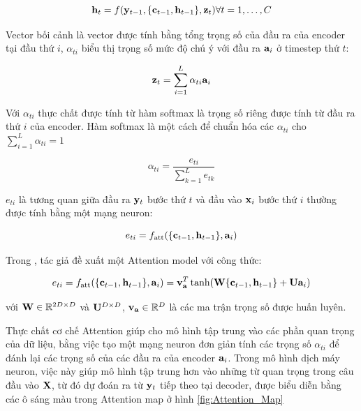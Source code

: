 \documentclass[14pt, a4paper]{article}
\numberwithin{equation}{section}
\numberwithin{algorithm}{section}
\numberwithin{figure}{section}
\numberwithin{dl}{section}
\numberwithin{md}{section}
\numberwithin{bd}{section}
\numberwithin{dn}{section}
\numberwithin{hq}{section}
\begin{document}
    \begin{equation}
        \bold{h}_t = f(\bold{y}_{t-1}, \lbrace \bold{c}_{t-1}, \bold{h}_{t-1} \rbrace, \bold{z}_t) \forall t=1,\dots,C
    \end{equation}

    Vector bối cảnh là vector được tính bằng tổng trọng số của đầu ra của encoder tại đầu thứ $i$, $\alpha_{ti}$ biểu thị trọng số mức độ chú ý với đầu ra $\bold{a}_i$ ở timestep thứ $t$:

    \begin{equation}
        \bold{z}_t = \sum_{i=1}^{L}\alpha_{ti}\bold{a}_i
    \end{equation}

    Với $\alpha_{ti}$ thực chất được tính từ hàm softmax là trọng số riêng được tính từ đầu ra thứ $i$ của encoder. Hàm softmax là một cách để chuẩn hóa các $\alpha_{ti}$ cho $\sum_{i=1}^{L}\alpha_{ti}=1$

    \begin{equation}
        \alpha_{ti} = \dfrac{e_{ti}}{\sum_{k=1}^{L} e_{tk}}
    \end{equation}

    $e_{ti}$ là tương quan giữa đầu ra $\bold{y}_t$ bước thứ $t$ và đầu vào $\bold{x}_i$ bước thứ $i$ thường được tính bằng một mạng neuron:

    \begin{equation}
        e_{ti} = f_{\text{att}}(\lbrace \bold{c}_{t-1}, \bold{h}_{t-1} \rbrace, \bold{a}_i)
    \end{equation}

    Trong \cite{bahdanau2014neural}, tác giả đề xuất một Attention model với công thức:

    \begin{equation}
        e_{ti} = f_{\text{att}}(\lbrace \bold{c}_{t-1}, \bold{h}_{t-1} \rbrace, \bold{a}_i) = \bold{v}_{\bold{a}}^T \tanh (\bold{W} \lbrace \bold{c}_{t-1}, \bold{h}_{t-1} \rbrace + \bold{U}\bold{a}_i)
    \end{equation}

    với $\bold{W} \in \mathbb{R}^{2D \times D}$ và $\bold{U}^{D \times D}$, $\bold{v}_{\bold{a}} \in \mathbb{R}^{D}$ là các ma trận trọng số được huấn luyên.

    Thực chất cơ chế Attention giúp cho mô hình tập trung vào các phần quan trọng của dữ liệu, bằng việc tạo một mạng neuron đơn giản tính các trọng số $\alpha_{ti}$ để đánh lại các trọng số của các đầu ra của encoder $\bold{a}_i$.
    Trong mô hình dịch máy neuron, việc này giúp mô hình tập trung hơn vào những từ quan trọng trong câu đầu vào $\bold{X}$, từ đó dự đoán ra từ $\bold{y}_t$ tiếp theo tại decoder, được biểu diễn bằng các ô sáng màu trong Attention map ở hình \ref{fig:Attention_Map}
\end{document}
